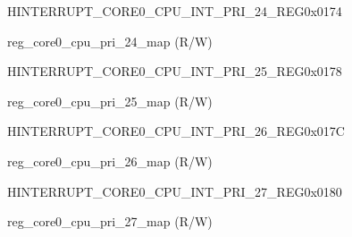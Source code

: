 \begin{register}{H}{INTERRUPT\_CORE0\_CPU\_INT\_PRI\_24\_REG}{0x0174}\label{regdesc:INTERRUPTCORE0CPUINTPRI24REG}
%
%
\regnewline%
\begin{regdesc}\begin{reglist}
\label{fielddesc:INTERRUPTCORE0CPUPRI24MAP}\item [INTERRUPT\_CORE0\_CPU\_PRI\_24\_MAP] reg\_core0\_cpu\_pri\_24\_map (R/W)
\end{reglist}\end{regdesc}
\end{register}


\begin{register}{H}{INTERRUPT\_CORE0\_CPU\_INT\_PRI\_25\_REG}{0x0178}\label{regdesc:INTERRUPTCORE0CPUINTPRI25REG}
%
%
\regnewline%
\begin{regdesc}\begin{reglist}
\label{fielddesc:INTERRUPTCORE0CPUPRI25MAP}\item [INTERRUPT\_CORE0\_CPU\_PRI\_25\_MAP] reg\_core0\_cpu\_pri\_25\_map (R/W)
\end{reglist}\end{regdesc}
\end{register}


\begin{register}{H}{INTERRUPT\_CORE0\_CPU\_INT\_PRI\_26\_REG}{0x017C}\label{regdesc:INTERRUPTCORE0CPUINTPRI26REG}
%
%
\regnewline%
\begin{regdesc}\begin{reglist}
\label{fielddesc:INTERRUPTCORE0CPUPRI26MAP}\item [INTERRUPT\_CORE0\_CPU\_PRI\_26\_MAP] reg\_core0\_cpu\_pri\_26\_map (R/W)
\end{reglist}\end{regdesc}
\end{register}


\begin{register}{H}{INTERRUPT\_CORE0\_CPU\_INT\_PRI\_27\_REG}{0x0180}\label{regdesc:INTERRUPTCORE0CPUINTPRI27REG}
%
%
\regnewline%
\begin{regdesc}\begin{reglist}
\label{fielddesc:INTERRUPTCORE0CPUPRI27MAP}\item [INTERRUPT\_CORE0\_CPU\_PRI\_27\_MAP] reg\_core0\_cpu\_pri\_27\_map (R/W)
\end{reglist}\end{regdesc}
\end{register}


